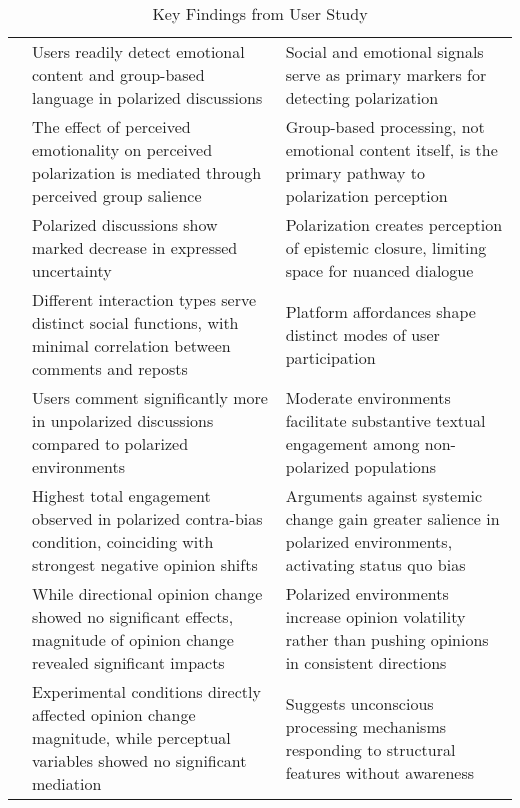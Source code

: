 \begin{table*}[h!]
\centering
\small
\caption{Key Findings from User Study}
\label{tab:user-study-findings}
\begin{tabularx}{\textwidth}{>{\centering\arraybackslash}p{1.5cm}>{\raggedright\arraybackslash}X>{\raggedright\arraybackslash}X}
\toprule
\multicolumn{1}{c}{\textbf{Analysis}} & \multicolumn{1}{c}{\textbf{Key Finding}} & \multicolumn{1}{c}{\textbf{Theoretical Implication}} \\
\midrule
\multirow{3}{*}{\rotatebox[origin=c]{90}{\textbf{Perception}}} 
    & Users readily detect emotional content and group-based language in polarized discussions 
    & Social and emotional signals serve as primary markers for detecting polarization \\
\cmidrule{2-3}
    & The effect of perceived emotionality on perceived polarization is mediated through perceived group salience 
    & Group-based processing, not emotional content itself, is the primary pathway to polarization perception \\
\cmidrule{2-3}
    & Polarized discussions show marked decrease in expressed uncertainty 
    & Polarization creates perception of epistemic closure, limiting space for nuanced dialogue \\
\midrule
\multirow{3}{*}{\rotatebox[origin=c]{90}{\textbf{Engagement}}} 
    & Different interaction types serve distinct social functions, with minimal correlation between comments and reposts 
    & Platform affordances shape distinct modes of user participation \\
\cmidrule{2-3}
    & Users comment significantly more in unpolarized discussions compared to polarized environments
    & Moderate environments facilitate substantive textual engagement among non-polarized populations \\
\cmidrule{2-3}
    & Highest total engagement observed in polarized contra-bias condition, coinciding with strongest negative opinion shifts
    & Arguments against systemic change gain greater salience in polarized environments, activating status quo bias \\
\midrule
\multirow{2}{*}{\rotatebox[origin=c]{90}{\textbf{Opinion}}} 
    & While directional opinion change showed no significant effects, magnitude of opinion change revealed significant impacts
    & Polarized environments increase opinion volatility rather than pushing opinions in consistent directions \\
\cmidrule{2-3}
    & Experimental conditions directly affected opinion change magnitude, while perceptual variables showed no significant mediation
    & Suggests unconscious processing mechanisms responding to structural features without awareness \\
\bottomrule
\end{tabularx}
\end{table*}